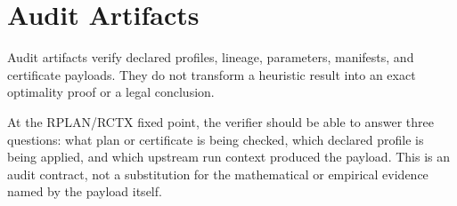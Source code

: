 \section{Audit Artifacts}

Audit artifacts verify declared profiles, lineage, parameters, manifests, and
certificate payloads. They do not transform a heuristic result into an exact
optimality proof or a legal conclusion.

At the RPLAN/RCTX fixed point, the verifier should be able to answer three
questions: what plan or certificate is being checked, which declared profile is
being applied, and which upstream run context produced the payload. This is an
audit contract, not a substitution for the mathematical or empirical evidence
named by the payload itself.
